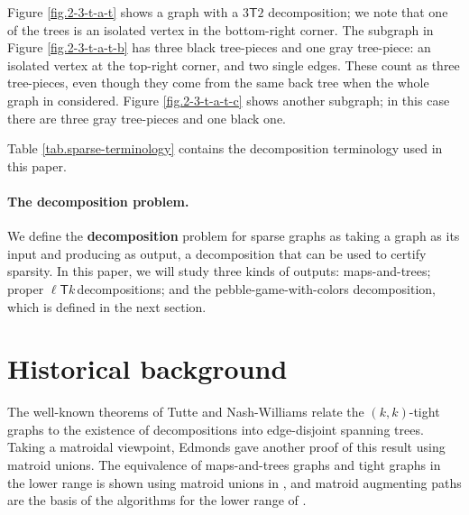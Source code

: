 \documentclass[Svgc,nospthms]{Svgc}
\newcommand{\ellteekay}{\ensuremath{\ell{\mathsf T}k}\,}
\newcommand{\reffig}[1]{Figure \ref{fig.#1}}
\begin{document}
	\reffig{2-3-t-a-t} shows a graph with a $3\mathsf{T}2$ decomposition; we note that one
	of the trees is an isolated vertex in the bottom-right corner.  The subgraph in 
	\reffig{2-3-t-a-t-b} has three black tree-pieces and one gray tree-piece: an isolated vertex at
	the top-right corner, and two single edges.  These count as three tree-pieces, even though 
	they come from the same back tree when the whole graph in considered.  \reffig{2-3-t-a-t-c}
	shows another subgraph; in this case there are three gray tree-pieces and one black one.
	
	Table \ref{tab.sparse-terminology} contains the decomposition terminology used in this paper.
	
	\paragraph{The decomposition problem.} 
	We define the {\bf decomposition} problem for sparse graphs as taking a graph as
	its input and producing as output, a decomposition that can be used to certify 
	sparsity.  In this paper, we will study three kinds of outputs: maps-and-trees; 
	proper \ellteekay decompositions; and the pebble-game-with-colors decomposition, 
	which is defined in the next section.
	


\section{Historical background}
The well-known theorems of Tutte \cite{tutte:decomposing-graph-in-factors-1961} and Nash-Williams \cite{nash-williams:decomposition-into-forests:1964} relate 
the $(k,k)$-tight graphs to the existence of decompositions into edge-disjoint 
spanning trees.  Taking a matroidal viewpoint, Edmonds \cite{Ed65,edmonds:matroidpolyhedra} 
gave another proof of this result using matroid unions.  The equivalence of 
maps-and-trees graphs and tight graphs in the lower range is shown using matroid 
unions in \cite{whiteley:union-matroids}, and matroid augmenting paths are the 
basis of the algorithms for the lower range of \cite{RoTa85,gabow:jcss-1995,gabow:forests:1992}.
\end{document}
